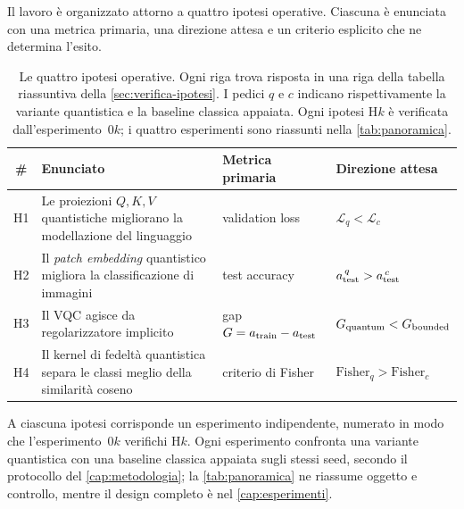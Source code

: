 Il lavoro è organizzato attorno a quattro ipotesi operative. Ciascuna è enunciata
con una metrica primaria, una direzione attesa e un criterio esplicito che ne
determina l'esito.

\begin{table}[htbp]
\centering
\caption[Le quattro ipotesi e i loro criteri di decisione]{%
Le quattro ipotesi operative. Ogni riga trova risposta in una riga della tabella
riassuntiva della \cref{sec:verifica-ipotesi}. I pedici $q$ e $c$ indicano
rispettivamente la variante quantistica e la baseline classica appaiata. Ogni
ipotesi H$k$ è verificata dall'esperimento~0$k$; i quattro esperimenti sono
riassunti nella \cref{tab:panoramica}.}
\label{tab:ipotesi}
\small
\begin{tabularx}{\textwidth}{@{}c X l l@{}}
\toprule
\textbf{\#} & \textbf{Enunciato} & \textbf{Metrica primaria} & \textbf{Direzione attesa} \\
\midrule
H1 & Le proiezioni $Q,K,V$ quantistiche migliorano la modellazione del linguaggio
   & validation loss & $\mathcal{L}_q < \mathcal{L}_c$ \\[4pt]
H2 & Il \emph{patch embedding} quantistico migliora la classificazione di immagini
   & test accuracy & $a_{\mathrm{test}}^{\,q} > a_{\mathrm{test}}^{\,c}$ \\[4pt]
H3 & Il VQC agisce da regolarizzatore implicito
   & gap $G = a_{\mathrm{train}} - a_{\mathrm{test}}$ & $G_{\text{quantum}} < G_{\text{bounded}}$ \\[4pt]
H4 & Il kernel di fedeltà quantistica separa le classi meglio della similarità coseno
   & criterio di Fisher & $\text{Fisher}_q > \text{Fisher}_c$ \\
\bottomrule
\end{tabularx}
\end{table}

A ciascuna ipotesi corrisponde un esperimento indipendente, numerato in modo che
l'esperimento~0$k$ verifichi H$k$. Ogni esperimento confronta una variante
quantistica con una baseline classica appaiata sugli stessi seed, secondo il
protocollo del \cref{cap:metodologia}; la \cref{tab:panoramica} ne riassume
oggetto e controllo, mentre il design completo è nel \cref{cap:esperimenti}.

